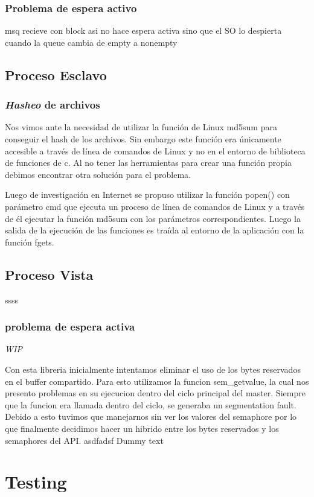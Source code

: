 \documentclass[10pt,a4paper]{report}
\begin{document}
\subsection{Problema de espera activo}
msq recieve con block asi no hace espera activa sino que el SO lo despierta cuando la queue cambia de empty a nonempty
\section{Proceso Esclavo}
\subsection{\textit{Hasheo} de archivos}
Nos vimos ante la necesidad de utilizar la función de Linux md5sum para conseguir el hash de los archivos. Sin embargo este función
era únicamente accesible a través de línea de comandos de Linux y no en el entorno de biblioteca de funciones de c. Al no tener las
herramientas para crear una función propia debimos encontrar otra solución para el problema.

Luego de investigación en Internet se propuso utilizar la función popen() con parámetro cmd que ejecuta un proceso de línea de comandos
de Linux y a través de él ejecutar la función md5sum con los parámetros correspondientes. Luego la salida de la ejecución de las funciones
es traída al entorno de la aplicación con la función fgets.
\section{Proceso Vista}
ssss
\subsection{problema de espera activa}
\emph{WIP}

	Con esta libreria inicialmente intentamos eliminar el uso de los bytes reservados en el buffer compartido. Para esto utilizamos la funcion sem\_getvalue, la cual nos presento problemas en su ejecucion dentro del ciclo principal del master.  Siempre que la funcion era llamada dentro del ciclo, se generaba un segmentation fault. Debido a esto tuvimos que manejarnos sin ver los valores del semaphore por lo que finalmente decidimos hacer un hibrido entre los bytes reservados y los semaphores del API.
asdfadsf
Dummy text


\chapter{Testing}
\end{document}

